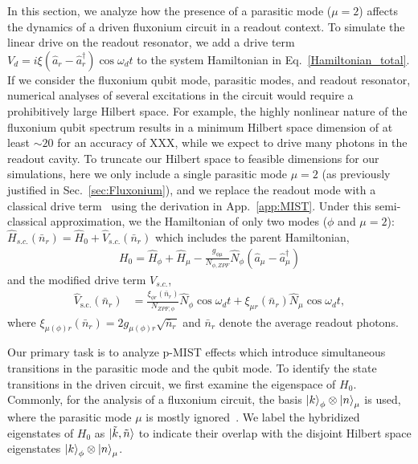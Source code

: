 \documentclass[%
reprint,
superscriptaddress,
 amsmath,amssymb,
 aps,
 prx,
longbibliography,
floatfix,
]{revtex4-2}
\begin{document}
 In this section, we analyze how the presence of a parasitic mode ($\mu=2$) affects the dynamics of a driven fluxonium circuit in a readout context. To simulate the linear drive on the readout resonator, we add a drive term $V_d=i\xi (\hat a_r-\hat a_r^\dagger)\cos{\omega_d t}$ to the system Hamiltonian in Eq.~\ref{Hamiltonian_total}. If we consider the fluxonium qubit mode, parasitic modes, and readout resonator, numerical analyses of several excitations in the circuit would require a prohibitively large Hilbert space. For example, the highly nonlinear nature of the fluxonium qubit spectrum results in a minimum Hilbert space dimension of at least $\sim 20$ for an accuracy of XXX, while we expect to drive many photons in the readout cavity. To truncate our Hilbert space to feasible dimensions for our simulations, here we only include a single parasitic mode $\mu=2$ (as previously justified in Sec.~\ref{sec:Fluxonium}), and we replace the readout mode with a classical drive term~\cite{cohen2023reminiscence,dumas2024unified,xiao2023diagrammatic} using the derivation in App.~\ref{app:MIST}. Under this semi-classical approximation, we the Hamiltonian of only two modes ($\phi$ and $\mu=2$): $\hat H_{s.c.}(\bar n_r)=\hat H_0+\hat V_{s.c.}(\bar n_r)$ which 
includes the parent Hamiltonian,
\begin{align}
H_0=\hat H_\phi+\hat H_{\mu}-\frac{g_{\phi\mu}}{N_{\phi,ZPF}} \hat N_\phi (\hat a_{\mu}-\hat a_{\mu}^\dagger)    
\end{align}
and the modified drive term $V_{s.c.}$,
\begin{align}
    \hat V_\textrm{s.c.}(\bar n_r)&=\frac{\xi_{\phi r}(\bar n_r)}{N_{ZPF,\phi}} \hat N_\phi\cos{\omega_d t}+\xi_{\mu r}(\bar n_r) \hat N_\mu\cos{\omega_d t},\label{eq:drive}
\end{align}
where $\xi_{\mu(\phi) r}(\bar n_r)=2g_{\mu(\phi) r}\sqrt{\bar n_r}$ and $\bar n_r$ denote the average readout photons. 


Our primary task is to analyze p-MIST effects which introduce simultaneous transitions in the parasitic mode and the qubit mode. To identify the state transitions in the driven circuit, we first examine the eigenspace of $H_0$. Commonly, for the analysis of a fluxonium circuit, the basis $\ket{k}_{\phi} \otimes \ket{n}_{\mu}$ is used, where the parasitic mode $\mu$ is mostly ignored~\cite{nesterov2024measurement}. We label the hybridized eigenstates of $H_{\textrm{0}}$ as  $\ket{\tilde{k}, \tilde{n}}$ to indicate their overlap with the disjoint Hilbert space eigenstates $\ket{k}_\phi\otimes\ket{n}_\mu$. 
\end{document}
